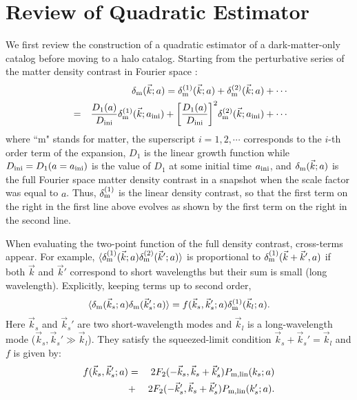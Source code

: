 \documentclass[prd,amsmath,amssymb,floatfix,superscriptaddress,nofootinbib,twocolumn]{revtex4-1}
\def\be{\begin{equation}}
\def\ee{\end{equation}}
\def\bea{\begin{eqnarray}}
\def\eea{\end{eqnarray}}
\newcommand{\ini}{\rm ini}
\newcommand{\vrr}{\vec{r}}
\newcommand{\vs}{\nonumber\\}
\newcommand{\vk}{\vec{k}}
\newcommand{\eql}[1]{\label{eq:#1}}
\begin{document}

\section{Review of Quadratic Estimator}

\noindent We first review the construction of a quadratic estimator of a dark-matter-only catalog \cite{Li:2020fir} before moving to a halo catalog. Starting from the perturbative series of the matter density contrast in Fourier space \cite{Jain:1994sop}\cite{Bernardeau:2002rev}:
\bea
&&\delta_{\rm m}(\vk;a)=\delta^{(1)}_{\rm m}(\vk;a)+\delta^{(2)}_{\rm m}(\vk;a)+\cdots\vs
&=&\frac{D_1(a)}{D_{\rm ini}}\delta^{(1)}_{\rm m}(\vk;a_{\ini})+\bigg[\frac{D_1(a)}{D_{\rm ini}}\bigg]^2\delta^{(2)}_{\rm m}(\vk;a_{\ini})+\cdots \eql{tayl}
\eea 
where ``m" stands for matter, the superscript $i=1,2,\cdots$ corresponds to the $i$-th order term of the expansion, $D_1$ is the linear growth function while $D_{\ini} = D_1(a=a_{\ini})$ is the value of $D_1$ at some initial time $a_{\rm ini}$, and $\delta_{\rm m}(\vk;a)$ is the full Fourier space matter density contrast in a snapshot when the scale factor was equal to $a$. Thus, $\delta_{\rm m}^{(1)}$ is the linear density contrast, so that the first term on the right in the first line above evolves as shown by the first term on the right in the second line.

When evaluating the two-point function of the full density contrast, cross-terms appear. For example, $\langle \delta_{\rm m}^{(1)}(\vk;a) \delta_{\rm m}^{(2)}(\vk';a) \rangle$ is proportional to $\delta^{(1)}_{\rm m}(\vk+\vk',a)$ if both $\vk$ and $\vk'$ correspond to short wavelengths but their sum is small (long wavelength). Explicitly, keeping terms up to second order, 
\be
\langle {\delta}_{\rm m}(\vec{k}_s;a){\delta}_{\rm m}(\vec{k}_s';a) \rangle =f(\vec{k}_s,\vec{k}_s';a){\delta}^{(1)}_{\rm m}(\vec{k}_l;a). \eql{2pt}
\ee 
Here $\vk_s$ and $\vk_s'$ are two short-wavelength modes and $\vk_l$ is a long-wavelength mode ($\vk_s,\vk_s' \gg \vk_l$). They satisfy the squeezed-limit condition $\vk_s+\vk_s'=\vk_l$ and $f$ is given by:
\bea
f(\vec{k}_s,\vec{k}_s';a)&=&2F_2(-\vec{k}_s,\vec{k}_s+\vec{k}_s')P_{\rm m,lin}(k_s;a)\vs
&+&2F_2(-\vec{k}_s',\vec{k}_s+\vec{k}_s')P_{\rm m,lin}(k_s';a)       .\eql{deff}
\eea 

\vspace*{22.6\baselineskip} 
\end{document}
